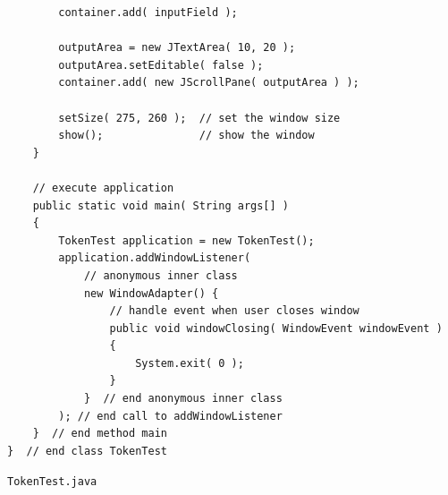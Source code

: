 \documentclass[a4paper,11pt]{article}
\newenvironment{code}{\captionsetup{type=listing}}{}
\begin{document}
\begin{code}
\begin{verbatim}
        container.add( inputField ); 

        outputArea = new JTextArea( 10, 20 );
        outputArea.setEditable( false );
        container.add( new JScrollPane( outputArea ) );

        setSize( 275, 260 );  // set the window size
        show();               // show the window
    }

    // execute application
    public static void main( String args[] )
    {
        TokenTest application = new TokenTest();
        application.addWindowListener(
            // anonymous inner class
            new WindowAdapter() {
                // handle event when user closes window
                public void windowClosing( WindowEvent windowEvent )
                {
                    System.exit( 0 );
                }
            }  // end anonymous inner class
        ); // end call to addWindowListener
    }  // end method main
}  // end class TokenTest
\end{verbatim}
\caption{\texttt{TokenTest.java}}
\end{code}
\end{document}
